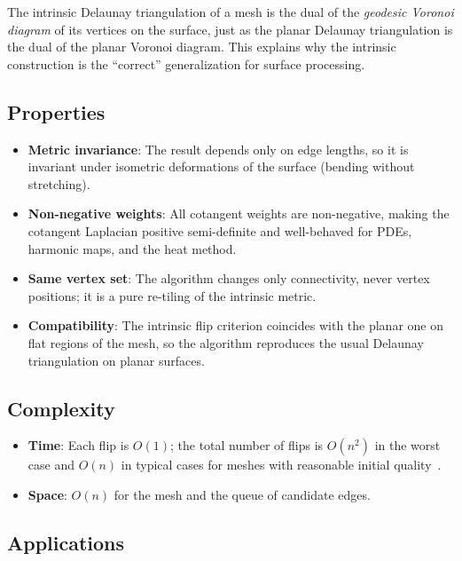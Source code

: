 \begin{remark}
The intrinsic Delaunay triangulation of a mesh is the dual of the \emph{geodesic Voronoi diagram} of its vertices on the surface, just as the planar Delaunay triangulation is the dual of the planar Voronoi diagram. This explains why the intrinsic construction is the ``correct'' generalization for surface processing.
\end{remark}

\subsection{Properties}

\begin{itemize}
\item \textbf{Metric invariance}: The result depends only on edge lengths, so it is invariant under isometric deformations of the surface (bending without stretching).
\item \textbf{Non-negative weights}: All cotangent weights are non-negative, making the cotangent Laplacian positive semi-definite and well-behaved for PDEs, harmonic maps, and the heat method.
\item \textbf{Same vertex set}: The algorithm changes only connectivity, never vertex positions; it is a pure re-tiling of the intrinsic metric.
\item \textbf{Compatibility}: The intrinsic flip criterion coincides with the planar one on flat regions of the mesh, so the algorithm reproduces the usual Delaunay triangulation on planar surfaces.
\end{itemize}

\subsection{Complexity}

\begin{itemize}
\item \textbf{Time}: Each flip is $O(1)$; the total number of flips is $O(n^2)$ in the worst case and $O(n)$ in typical cases for meshes with reasonable initial quality~\cite{fisher2007}.
\item \textbf{Space}: $O(n)$ for the mesh and the queue of candidate edges.
\end{itemize}

\subsection{Applications}

